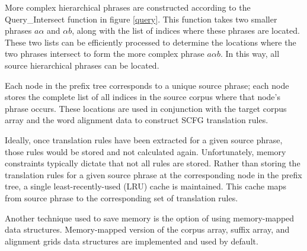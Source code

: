 \documentclass{pbml}
\begin{document}
More complex hierarchical phrases are constructed according to the {\sc Query\_Intersect} function in figure \ref{query}. This function takes two smaller phrases $a\alpha$ and $\alpha{}b$, along with the list of indices where these phrases are located. These two lists can be efficiently processed to determine the locations where the two phrases intersect to form the more complex phrase $a\alpha{}b$. In this way, all source hierarchical phrases can be located.

Each node in the prefix tree corresponds to a unique source phrase; each node stores the complete list of all indices in the source corpus where that node's phrase occurs. These locations are used in conjunction with the target corpus array and the word alignment data to construct SCFG translation rules.

Ideally, once translation rules have been extracted for a given source phrase, those rules would be stored and not calculated again. Unfortunately, memory constraints typically dictate that not all rules are stored. Rather than storing the translation rules for a given source phrase at the corresponding node in the prefix tree, a single least-recently-used (LRU) cache is maintained. This cache maps from source phrase to the corresponding set of translation rules. 

Another technique used to save memory is the option of using memory-mapped data structures. Memory-mapped version of the corpus array, suffix array, and alignment grids data structures are implemented and used by default.
\end{document}
